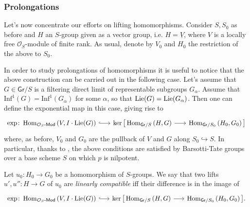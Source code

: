 \subsubsection{Prolongations}
Let's now concentrate our efforts on lifting homomorphisms.
Consider $S, S_0$ as before and
$H$ an $S$-group given as a vector group,
i.e. $H = \underline{V}$, where $V$ is a locally free $\mathcal{O}_{ S }$-module
of finite rank.
As usual, denote by $V_0$ and $H_0$ the restriction of the above to $S_0$.


\begin{rem}
	In order to study prolongations of homomorphisms it is useful to notice that
	the above construction can be carried out in the following case.
	Let's assume that $G \in \mathsf{Gr}/S$ is a filtering direct limit of
	representable subgroups $G_\alpha$.
	Assume that $\mathrm{Inf}^1(G) = \mathrm{Inf}^1(G_\alpha)$ for some $\alpha$,
	so that $\operatorname{Lie}(G) = \operatorname{Lie}(G_\alpha)$.
	Then one can define the exponential map in this case, giving rise to
	\begin{equation*}
	\begin{tikzcd}[row sep = 0ex, column sep = 1.75em
		,/tikz/column 1/.append style={anchor=base east}
		,/tikz/column 2/.append style={anchor=base west}]
		\exp\colon
		\Hom_{ \mathcal{O}_{ S }\text{-}\mathsf{Mod} }
		\left( V, I \cdot \lie(G) \right)
		\arrow[r, "", hookrightarrow] &
		\ker \big[ 
		\Hom_{ \mathsf{Gr}/S } 
		\left( H, G \right)
		\arrow[r, "", rightarrow] &
		\Hom_{ \mathsf{Gr}/S_0 }
		\left( H_0, G_0 \right)
		\big]
	\end{tikzcd}
	\end{equation*} 
	where, as before, $V_0$ and $G_0$ are the pullback of $V$ and $G$ 
	along $S_0 \hookrightarrow S$.
	In particular, thanks to \cite[Chapter II, Corollary 3.3.16]{Messing},
	the above conditions are satisfied by Barsotti-Tate
	groups over a base scheme $S$ on which $p$ is nilpotent.
\end{rem}


\begin{defn}\label{defn:LinCompProlong}
	Let $u_0\colon H_0 \to G_0$ be a homomorphism of $S$-groups.
	We say that two lifts $u', u''\colon H \to G$ of $u_0$
	are \emph{linearly compatible} iff their difference is in the image
	of 
	\begin{equation*}
	\begin{tikzcd}[row sep = 0ex, column sep = 1.62em
		,/tikz/column 1/.append style={anchor=base east}
		,/tikz/column 2/.append style={anchor=base west}]
		\exp\colon
		\Hom_{ \mathcal{O}_{ S }\text{-}\mathsf{Mod} }
		\left( V, I \cdot \lie(G) \right)
		\arrow[r, "", hookrightarrow] &
		\ker \big[ 
		\Hom_{ \mathsf{Gr}/S } 
		\left( H, G \right)
		\arrow[r, "", rightarrow] &
		\Hom_{ \mathsf{Gr}/S_0 }
		\left( H_0, G_0 \right)
		\big]
	.\end{tikzcd}
	\end{equation*} 
\end{defn}


